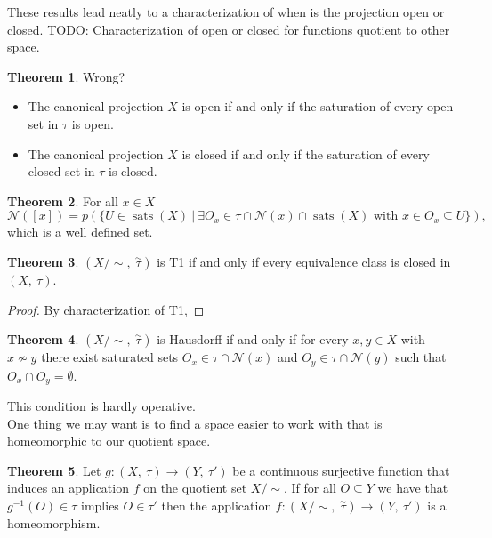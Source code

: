 \documentclass[a4paper]{book}
\theoremstyle{definition}
\newtheorem{theorem}{Theorem}[section]
\theoremstyle{ejemplo}
\theoremstyle{demostracion}
\newcommand{\quottop}{\stackrel{\sim}{\tau}}
\DeclareMathOperator{\sats}{sats}
\begin{document}
These results lead neatly to a characterization of when is the projection open or closed.
TODO: Characterization of open or closed for functions quotient to other space.
\begin{theorem}
Wrong?
	\begin{itemize}
		\item
		The canonical projection $X$ is open if and only if the saturation of every open set in $\tau$ is open.
		
		\item
		The canonical projection $X$ is closed if and only if the saturation of every closed set in $\tau$ is closed.
	\end{itemize}
\end{theorem}

\begin{theorem}
	For all $x \in X$
	\begin{equation*}
		\mathcal{N}([x]) = p(\{ U \in \sats(X)\ |\ \exists O_x \in \tau \cap \mathcal{N}(x) \cap \sats(X) \text{ with } x \in O_x \subseteq U\}),
	\end{equation*}
	which is a well defined set.
\end{theorem}

\begin{theorem}
	$(X/\sim,\ \quottop)$ is T1 if and only if every equivalence class is closed in $(X,\ \tau)$.
\end{theorem}

\begin{proof}
	By characterization of T1, 
\end{proof}

\begin{theorem}
	$(X/\sim,\ \quottop)$ is Hausdorff if and only if for every $x, y \in X$ with $x \not \sim y$ there exist saturated sets $O_x \in \tau \cap \mathcal{N}(x)$ and $O_y \in \tau \cap \mathcal{N}(y)$ such that $O_x \cap O_y = \emptyset$.
\end{theorem}

This condition is hardly operative.\\ 

One thing we may want is to find a space easier to work with that is homeomorphic to our quotient space.

\begin{theorem}
	Let $g: (X,\ \tau) \rightarrow (Y,\ \tau')$ be a continuous surjective function that induces an application $f$ on the quotient set $X/\sim$. If for all $O \subseteq Y$ we have that $g^{-1}(O) \in \tau$ implies $O \in \tau'$ then the application $f: (X/\sim,\ \quottop) \rightarrow (Y,\ \tau')$ is a homeomorphism.
\end{theorem}
\end{document}
